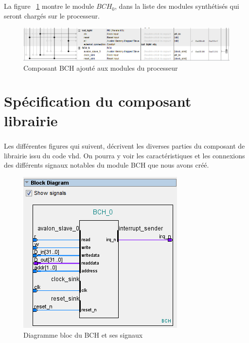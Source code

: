 \documentclass[a4paper, 11pt, svgnames]{report}
\begin{document}
        \paragraph{}
            La figure ~\ref{fig:BCH_0_component} montre le module $BCH_0$, dans
            la liste des modules synthétisés qui seront chargés sur le processeur.
        
        \begin{figure}[H]
            \centering
            \includegraphics[width=\textwidth]{./images/BCH_0_component}
            \caption{Composant BCH ajouté aux modules du processeur}
            \label{fig:BCH_0_component}
        \end{figure}

    \chapter{Spécification du composant librairie}
        \paragraph{}
            Les différentes figures qui suivent, décrivent les diverses
            parties du composant de librairie issu du code vhd. On pourra y
            voir les caractéristiques et les connexions des différents signaux
            notables du module BCH que nous avons créé.

        \begin{figure}[H]
            \centering
            \includegraphics[width=\textwidth]{./images/BCH_0_block_diagram}
            \caption{Diagramme bloc du BCH et ses signaux}
            \label{fig:BCH_0_block_diagram}
        \end{figure}
\end{document}
